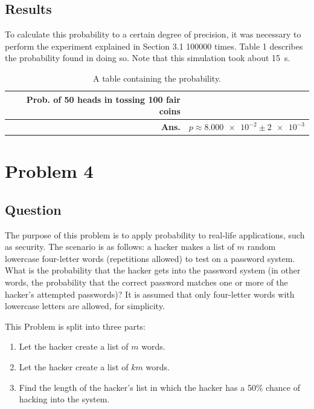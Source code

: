 \documentclass{article}
\begin{document}
\pagebreak

\subsection{Results} To calculate this probability
to a certain degree of precision,
it was necessary to perform the experiment explained in Section
3.1 \num{100000} times. Table 1 describes the probability
found in doing so. Note that this simulation took about
\SI{15}{\second}.

\begin{table}[H]
    \centering\begin{tabular}{| r | l |}
        \hline
        Prob. of 50 heads in tossing 100 fair coins & \\ \hline
        \textbf{Ans.} & \(p \approx \num{8.000e-2} \pm \num{2e-3}\) \\ \hline
    \end{tabular}
    \caption{A table containing the probability.}
    \label{prob3}
\end{table}

\section{Problem 4}
\subsection{Question} The purpose of this problem is to
apply probability to real-life applications, such as
security. The scenario is as follows: a hacker makes a list
of \(m\) random lowercase four-letter words (repetitions
allowed) to test on a password system. What is the probability
that the hacker gets into the password system (in other words,
the probability that the correct password matches one or
more of the hacker's attempted passwords)? It is assumed
that only four-letter words with lowercase letters are
allowed, for simplicity.

This Problem is split into three parts:
\begin{enumerate}
    \item Let the hacker create a list of \(m\) words.
    \item Let the hacker create a list of \(km\) words.
    \item Find the length of the hacker's list in which the
    hacker has a \num{50}\% chance of hacking into the system.
\end{enumerate}
\end{document}
